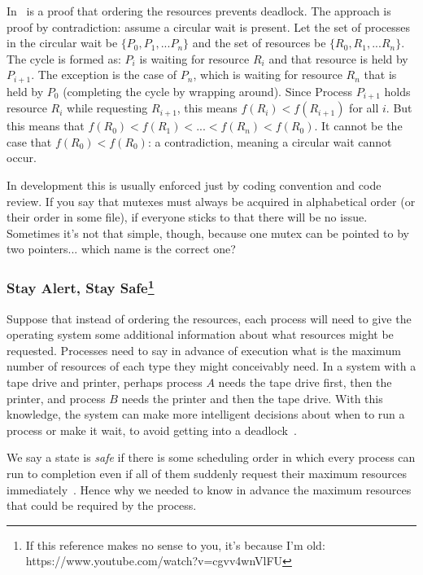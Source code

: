 \documentclass[a4paper]{report}
\begin{document}
In~\cite{osc} is a proof that ordering the resources prevents deadlock. The approach is proof by contradiction: assume a circular wait is present. Let the set of processes in the circular wait be $\{P_{0}, P_{1}, ... P_{n}\}$ and the set of resources be $\{R_{0}, R_{1}, ... R_{n}\}$. The cycle is formed as: $P_{i}$ is waiting for resource $R_{i}$ and that resource is held by $P_{i+1}$. The exception is the case of $P_{n}$, which is waiting for resource $R_{n}$ that is held by $P_{0}$ (completing the cycle by wrapping around). Since Process $P_{i+1}$ holds resource $R_{i}$ while requesting $R_{i+1}$, this means $f(R_{i}) < f(R_{i+1})$ for all $i$. But this means that $f(R_{0}) < f(R_{1}) < ... < f(R_{n}) < f(R_{0})$. It cannot be the case that $f(R_{0}) < f(R_{0})$: a contradiction, meaning a circular wait cannot occur.

In development this is usually enforced just by coding convention and code review. If you say that mutexes must always be acquired in alphabetical order (or their order in some file), if everyone sticks to that there will be no issue. Sometimes it's not that simple, though, because one mutex can be pointed to by two pointers... which name is the correct one?

\subsubsection*{Stay Alert, Stay Safe\footnote{If this reference makes no sense to you, it's because I'm old: https://www.youtube.com/watch?v=cgvv4wnVlFU}}

Suppose that instead of ordering the resources, each process will need to give the operating system some additional information about what resources might be requested. Processes need to say in advance of execution what is the maximum number of resources of each type they might conceivably need. In a system with a tape drive and printer, perhaps process $A$ needs the tape drive first, then the printer, and process $B$ needs the printer and then the tape drive. With this knowledge, the system can make more intelligent decisions about when to run a process or make it wait, to avoid getting into a deadlock~\cite{osc}.

We say a state is \textit{safe} if there is some scheduling order in which every process can run to completion even if all of them suddenly request their maximum resources immediately~\cite{mos}. Hence why we needed to know in advance the maximum resources that could be required by the process.
\end{document}
